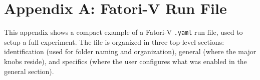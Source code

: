 \chapter{Appendix A: Fatori-V Run File}
\label{app_a:yaml}

This appendix shows a compact example of a \ac{Fatori-V} \texttt{.yaml} run file, used to setup a full experiment. The file is organized in three top-level sections: identification (used for folder naming and organization), general (where the major knobs reside), and specifics (where the user configures what was enabled in the general section).

\begingroup
\setlength{\columnsep}{28pt}     %

